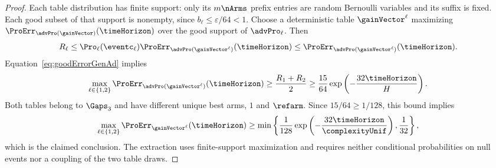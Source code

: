 \begin{proof}
Each table distribution has finite support: only its $m\nArms$
prefix entries are random Bernoulli variables and its suffix is fixed.
Each good subset of that support is nonempty, since
$b_\ell\leq\varepsilon/64<1$. Choose a deterministic table
$\gainVector^\ell$ maximizing
$\ProErr_{\advPro(\gainVector)}(\timeHorizon)$ over the good support of
$\advPro_\ell$. Then
\[
R_\ell\leq\Pro_\ell(\eventc_\ell)
\ProErr_{\advPro(\gainVector^\ell)}(\timeHorizon)
\leq\ProErr_{\advPro(\gainVector^\ell)}(\timeHorizon).
\]
Equation~\ref{eq:goodErrorGenAd} implies
\[
\max_{\ell\in\{1,2\}}
\ProErr_{\advPro(\gainVector^\ell)}(\timeHorizon)
\geq\frac{R_1+R_2}{2}
\geq\frac{15}{64}\exp\left(-\frac{32\timeHorizon}{H}\right).
\]
Both tables belong to $\Gaps_3$ and have different unique best arms,
$1$ and $\refarm$. Since $15/64\geq1/128$, this bound implies
\[
\max_{\ell\in\{1,2\}}\ProErr_{\gainVector^\ell}(\timeHorizon)
\geq\min\left\{\frac1{128}\exp\left(-\frac{32\timeHorizon}
{\complexityUnif}\right),\frac1{32}\right\},
\]
which is the claimed conclusion. The extraction uses finite-support
maximization and requires neither conditional probabilities on null
events nor a coupling of the two table draws.
\end{proof}%
